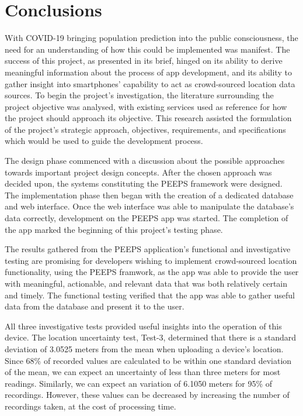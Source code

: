 \chapter{Conclusions}

With COVID-19 bringing population prediction into the public consciousness, the need for an understanding of how this could be implemented was manifest. The success of this project, as presented in its brief, hinged on its ability to derive meaningful information about the process of app development, and its ability to gather insight into smartphones' capability to act as crowd-sourced location data sources. To begin the project's investigation, the literature surrounding the project objective was analysed, with existing services used as reference for how the project should approach its objective. This research assisted the formulation of the project's strategic approach, objectives, requirements, and specifications which would be used to guide the development process. 

The design phase commenced with a discussion about the possible approaches towards important project design concepts. After the chosen approach was decided upon, the systems constituting the PEEPS framework were designed. The implementation phase then began with the creation of a dedicated database and web interface. Once the web interface was able to manipulate the database's data correctly, development on the PEEPS app was started. The completion of the app marked the beginning of this project's testing phase.

The results gathered from the PEEPS application's functional and investigative testing are promising for developers wishing to implement crowd-sourced location functionality, using the PEEPS framwork, as the app was able to provide the user with meaningful, actionable, and relevant data that was both relatively certain and timely. The functional testing verified that the app was able to gather useful data from the database and present it to the user. 

All three investigative tests provided useful insights into the operation of this device. The location uncertainty test, Test-3, determined that there is a standard deviation of 3.0525 meters from the mean when uploading a device's location. Since 68\% of recorded values are calculated to be within one standard deviation of the mean, we can expect an uncertainty of less than three meters for most readings. Similarly, we can expect an variation of 6.1050 meters for 95\% of recordings. However, these values can be decreased by increasing the number of recordings taken, at the cost of processing time.

